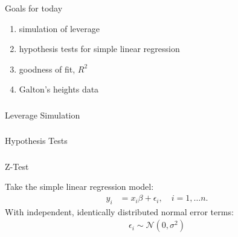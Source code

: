 \begin{frame}[fragile] \frametitle{}

{\color{yaleblue}\fontsize{16pt}{20pt}\selectfont Goals for today}

\begin{enumerate}
\item simulation of leverage
\item hypothesis tests for simple linear regression
\item goodness of fit, $R^2$
\item Galton's heights data
\end{enumerate}

\end{frame}

\begin{frame}[fragile] \frametitle{}

\begin{flushright}
{\color{yaleblue}\sc\fontsize{1cm}{0cm}\selectfont Leverage Simulation}
\end{flushright}

\end{frame}

\begin{frame}[fragile] \frametitle{}

\begin{flushright}
{\color{yaleblue}\sc\fontsize{1cm}{0cm}\selectfont Hypothesis Tests}
\end{flushright}

\end{frame}

\begin{frame}[fragile] \frametitle{}

{\color{yaleblue}\fontsize{16pt}{20pt}\selectfont Z-Test}

Take the simple linear regression model:
\begin{align*}
y_i &=  x_i\beta  + \epsilon_i, \quad i = 1, \ldots n.
\end{align*}
With independent, identically distributed normal error terms:
\begin{align*}
\epsilon_i \sim \mathcal{N}(0, \sigma^2)
\end{align*}

\end{frame}

